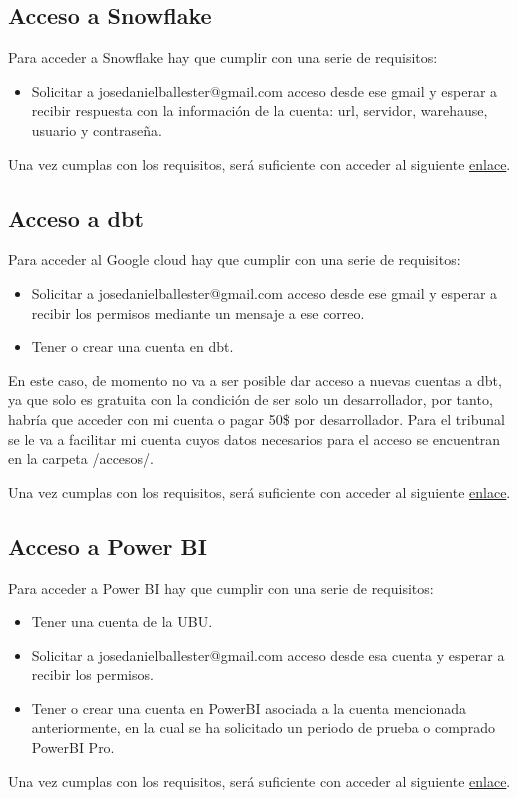 \subsection{Acceso a Snowflake}
Para acceder a Snowflake hay que cumplir con una serie de requisitos:
\begin{itemize}
    \item Solicitar a josedanielballester@gmail.com acceso desde ese gmail y esperar a recibir respuesta con la información de la cuenta: url, servidor, warehause, usuario y contraseña.
\end{itemize}
Una vez cumplas con los requisitos, será suficiente con acceder al siguiente \href{https://app.snowflake.com/switzerland-north.azure/sh96129/data/databases}{enlace}.
\subsection{Acceso a dbt}
Para acceder al Google cloud hay que cumplir con una serie de requisitos:
\begin{itemize}
    \item Solicitar a josedanielballester@gmail.com acceso desde ese gmail y esperar a recibir los permisos mediante un mensaje a ese correo.
    \item Tener o crear una cuenta en dbt.
\end{itemize}
En este caso, de momento no va a ser posible dar acceso a nuevas cuentas a dbt, ya que solo es gratuita con la condición de ser solo un desarrollador, por tanto, habría que acceder con mi cuenta o pagar 50\$ por desarrollador. Para el tribunal se le va a facilitar mi cuenta cuyos datos necesarios para el acceso se encuentran en la carpeta /accesos/.

Una vez cumplas con los requisitos, será suficiente con acceder al siguiente \href{https://cloud.getdbt.com/login/}{enlace}.

\subsection{Acceso a Power BI}
Para acceder a Power BI hay que cumplir con una serie de requisitos:
\begin{itemize}
    \item Tener una cuenta de la UBU.
    \item Solicitar a josedanielballester@gmail.com acceso desde esa cuenta y esperar a recibir los permisos.
    \item Tener o crear una cuenta en PowerBI asociada a la cuenta mencionada anteriormente,  en la cual se ha solicitado un periodo de prueba o comprado PowerBI Pro.
\end{itemize}
Una vez cumplas con los requisitos, será suficiente con acceder al siguiente \href{https://app.powerbi.com/groups/a6ea5768-7f17-4ad1-a227-d103fc7c722c/list?refreshAccessToken=true}{enlace}.

